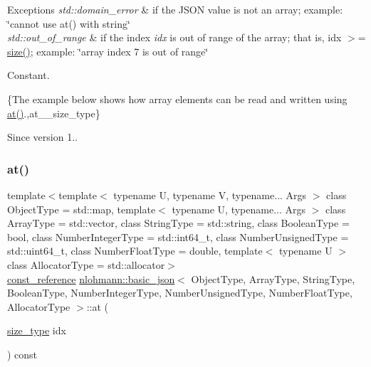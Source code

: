 \begin{DoxyExceptions}{Exceptions}
{\em std\+::domain\+\_\+error} & if the J\+S\+ON value is not an array; example\+: {\ttfamily \char`\"{}cannot use at() with string\char`\"{}} \\
\hline
{\em std\+::out\+\_\+of\+\_\+range} & if the index {\itshape idx} is out of range of the array; that is, {\ttfamily idx $>$= \hyperlink{classnlohmann_1_1basic__json_a0ea8a1ecca4b3cb0ba09ad7552c364b6}{size()}}; example\+: {\ttfamily \char`\"{}array index 7 is out of range\char`\"{}}\\
\hline
\end{DoxyExceptions}
Constant.

\{The example below shows how array elements can be read and written using {\ttfamily \hyperlink{classnlohmann_1_1basic__json_a214a8c22d616fd3567b88932c07436c9}{at()}}.,at\+\_\+\+\_\+size\+\_\+type\}

\begin{DoxySince}{Since}
version 1.. 
\end{DoxySince}
\hypertarget{classnlohmann_1_1basic__json_a3f7029fe6d929cf2fa48df1233ccd761}{}\label{classnlohmann_1_1basic__json_a3f7029fe6d929cf2fa48df1233ccd761} 
\subsubsection{\texorpdfstring{at()}{at()}\hspace{0.1cm}{\footnotesize\ttfamily [2/6]}}
{\footnotesize\ttfamily template$<$template$<$ typename U, typename V, typename... Args $>$ class Object\+Type = std\+::map, template$<$ typename U, typename... Args $>$ class Array\+Type = std\+::vector, class String\+Type  = std\+::string, class Boolean\+Type  = bool, class Number\+Integer\+Type  = std\+::int64\+\_\+t, class Number\+Unsigned\+Type  = std\+::uint64\+\_\+t, class Number\+Float\+Type  = double, template$<$ typename U $>$ class Allocator\+Type = std\+::allocator$>$ \\
\hyperlink{classnlohmann_1_1basic__json_af677a29b0e66edc9f66e5167e4667071}{const\+\_\+reference} \hyperlink{classnlohmann_1_1basic__json}{nlohmann\+::basic\+\_\+json}$<$ Object\+Type, Array\+Type, String\+Type, Boolean\+Type, Number\+Integer\+Type, Number\+Unsigned\+Type, Number\+Float\+Type, Allocator\+Type $>$\+::at (\begin{DoxyParamCaption}\item[{\hyperlink{classnlohmann_1_1basic__json_a1579a8f72a230358d6cd1a6e8a62859b}{size\+\_\+type}}]{idx }\end{DoxyParamCaption}) const\hspace{0.3cm}{\ttfamily [inline]}}



